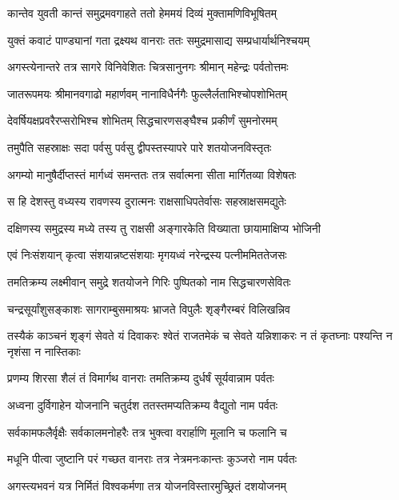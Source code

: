 \twolineshloka
{कान्तेव युवती कान्तं समुद्रमवगाहते}
{ततो हेममयं दिव्यं मुक्तामणिविभूषितम्} %

\twolineshloka
{युक्तं कवाटं पाण्ड्यानां गता द्रक्ष्यथ वानराः}
{ततः समुद्रमासाद्य सम्प्रधार्यार्थनिश्चयम्} %

\twolineshloka
{अगस्त्येनान्तरे तत्र सागरे विनिवेशितः}
{चित्रसानुनगः श्रीमान् महेन्द्रः पर्वतोत्तमः} %

\twolineshloka
{जातरूपमयः श्रीमानवगाढो महार्णवम्}
{नानाविधैर्नगैः फुल्लैर्लताभिश्चोपशोभितम्} %

\twolineshloka
{देवर्षियक्षप्रवरैरप्सरोभिश्च शोभितम्}
{सिद्धचारणसङ्घैश्च प्रकीर्णं सुमनोरमम्} %

\twolineshloka
{तमुपैति सहस्राक्षः सदा पर्वसु पर्वसु}
{द्वीपस्तस्यापरे पारे शतयोजनविस्तृतः} %

\twolineshloka
{अगम्यो मानुषैर्दीप्तस्तं मार्गध्वं समन्ततः}
{तत्र सर्वात्मना सीता मार्गितव्या विशेषतः} %

\twolineshloka
{स हि देशस्तु वध्यस्य रावणस्य दुरात्मनः}
{राक्षसाधिपतेर्वासः सहस्राक्षसमद्युतेः} %

\twolineshloka
{दक्षिणस्य समुद्रस्य मध्ये तस्य तु राक्षसी}
{अङ्गारकेति विख्याता छायामाक्षिप्य भोजिनी} %

\twolineshloka
{एवं निःसंशयान् कृत्वा संशयान्नष्टसंशयाः}
{मृगयध्वं नरेन्द्रस्य पत्नीममिततेजसः} %

\twolineshloka
{तमतिक्रम्य लक्ष्मीवान् समुद्रे शतयोजने}
{गिरिः पुष्पितको नाम सिद्धचारणसेवितः} %

\twolineshloka
{चन्द्रसूर्यांशुसङ्काशः सागराम्बुसमाश्रयः}
{भ्राजते विपुलैः शृङ्गैरम्बरं विलिखन्निव} %

\threelineshloka
{तस्यैकं काञ्चनं शृङ्गं सेवते यं दिवाकरः}
{श्वेतं राजतमेकं च सेवते यन्निशाकरः}
{न तं कृतघ्नाः पश्यन्ति न नृशंसा न नास्तिकाः} %

\twolineshloka
{प्रणम्य शिरसा शैलं तं विमार्गथ वानराः}
{तमतिक्रम्य दुर्धर्षं सूर्यवान्नाम पर्वतः} %

\twolineshloka
{अध्वना दुर्विगाहेन योजनानि चतुर्दश}
{ततस्तमप्यतिक्रम्य वैद्युतो नाम पर्वतः} %

\twolineshloka
{सर्वकामफलैर्वृक्षैः सर्वकालमनोहरैः}
{तत्र भुक्त्वा वरार्हाणि मूलानि च फलानि च} %

\twolineshloka
{मधूनि पीत्वा जुष्टानि परं गच्छत वानराः}
{तत्र नेत्रमनःकान्तः कुञ्जरो नाम पर्वतः} %

\twolineshloka
{अगस्त्यभवनं यत्र निर्मितं विश्वकर्मणा}
{तत्र योजनविस्तारमुच्छ्रितं दशयोजनम्} %

